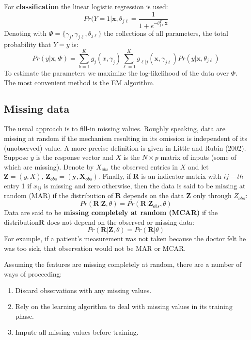 \documentclass[12pt, letterpaper]{article}
\theoremstyle{definition}
\newcommand{\X}{\mathrm{\mathbf{X}}}
\newcommand{\y}{\mathbf{y}}
\newcommand{\x}{\mathbf{x}}
\begin{document}
For \textbf{classification} the linear logistic regression is used:
\begin{equation}
Pr(Y=1|\x, \theta_{j\ell} = \frac{1}{1+e^{-\theta_{j\ell}^T\x}}
\end{equation}
Denoting with $\Phi = \{\gamma_j,\gamma_{j\ell}, \theta_{j\ell}\}$ the collections of all parameters, the total probability that $Y=y$ is:
\begin{equation}
Pr(y|\x, \Phi) = \sum_{k=1}^K g_j(x, \gamma_j)\sum_{\ell=1}^K g_{\ell|j}(\x, \gamma_{j\ell})Pr(y|\x,\theta_{j\ell})
\end{equation}
To estimate the parameters we maximize the log-likelihood of the data over $\Phi$. The most convenient method is the EM algorithm.

\subsection{Missing data}
The usual approach is to fill-in missing values. Roughly speaking, data are missing at random if the mechanism resulting in its omission is independent of its (unobserved) value. A more precise definition is given in Little and Rubin (2002). Suppose $y$ is the response vector and $X$ is the $N \times p$ matrix of inputs (some of which are missing). Denote by $X_{obs}$ the observed entries in $X$ and let $\mathbf{Z} = (y, X)$, $\mathbf{Z}_{obs} = (\y, \X_{obs})$. Finally, if $\mathbf{R}$ is an indicator matrix with $ij-th$entry 1 if $x_{ij}$ is missing and zero otherwise, then the data is said to be missing at random (MAR) if the distribution of $\mathbf{R}$ depends on the data $\mathbf{Z}$ only through $Z_{obs}$:
\begin{equation}
Pr(\mathbf{R}|\mathbf{Z},\theta) = Pr (\mathbf{R}|\mathbf{Z}_{obs},\theta)
\end{equation}
Data are said to be \textbf{missing completely at random (MCAR)} if the distribution$\mathbf{R}$ does not depend on the observed or missing data:
\begin{equation}
Pr(\mathbf{R}|\mathbf{Z},\theta) = Pr (\mathbf{R}|\theta)
\end{equation}
For example, if a patient’s measurement was not taken because the doctor felt he was too sick, that observation would not be MAR or MCAR.

Assuming the features are missing completely at random, there are a number of ways of proceeding:

\begin{enumerate}
\item \label{Missingi}Discard observations with any missing values.
\item \label{Missingii}Rely on the learning algorithm to deal with missing values in its training phase.
\item \label{Missingiii}Impute all missing values before training.
\end{enumerate}
\end{document}
